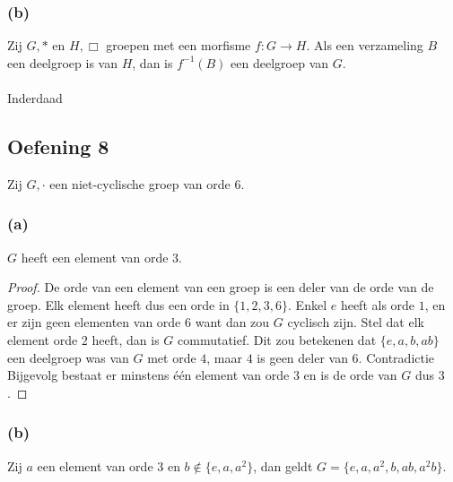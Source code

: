 \documentclass[main.tex]{subfiles}
\begin{document}
\subsubsection*{(b)}
Zij $G,*$ en $H,\Box$ groepen met een morfisme $f: G \rightarrow H$.
Als een verzameling $B$ een deelgroep is van $H$, dan is $f^{-1}(B)$ een deelgroep van $G$.\\\\
Inderdaad

\subsection*{Oefening 8}
\label{oza:oz1-oef8}
Zij $G,\cdot$ een niet-cyclische groep van orde $6$.

\subsubsection*{(a)}
$G$ heeft een element van orde $3$.

\begin{proof}
De orde van een element van een groep is een deler van de orde van de groep.
Elk element heeft dus een orde in $\{ 1, 2, 3, 6 \}$.
Enkel $e$ heeft als orde $1$, en er zijn geen elementen van orde $6$ want dan zou $G$ cyclisch zijn.
Stel dat elk element orde $2$ heeft, dan is $G$ commutatief.
Dit zou betekenen dat $\{ e,a,b,ab \}$ een deelgroep was van $G$ met orde $4$, maar $4$ is geen deler van $6$. Contradictie
Bijgevolg bestaat er minstens \'e\'en element van orde $3$ en is de orde van $G$ dus $3$.

\end{proof}

\subsubsection*{(b)}
Zij $a$ een element van orde $3$ en $b \not\in \{ e,a,a^{2} \}$, dan geldt $G= \{ e,a,a^{2},b,ab,a^{2}b \}$.
\end{document}
